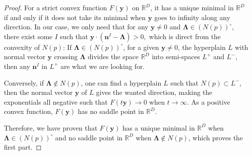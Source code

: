 \documentclass[12pt]{article}
\theoremstyle{definition}
\theoremstyle{plain}
\begin{document}
\begin{proof}
For a strict convex function $F(\mathbf y)$ on $\mathbb R^D$, it has a unique minimal in $\mathbb R^D$ 
if and only if it does not take its minimal when $\mathbf{y}$ goes to infinity along any direction. 
In our case, we only need that for any $\mathbf{y}\neq 0$ and $\mathbf\Lambda \in (N(p))^\circ $, 
there exist some $I$ such that  
\(
	\mathbf{y}\cdot (\mathbf{n}^I-\mathbf{\Lambda})>0,
\)
which is direct from the convexity of $N(p)$: If $\mathbf\Lambda \in (N(p))^\circ$,
for a given $\mathbf y\neq 0$, the hyperplain $L$ with normal vector $\mathbf y$ crossing $\mathbf \Lambda$ 
divides the space $\mathbb R^D$ into semi-spaces $L^+$ and $L^-$, then any $\mathbf{n}^I$ 
in $L^+$ are what we are looking for.

\begin{center}
\end{center}
Conversely, if $\mathbf\Lambda \not\in N(p)$, one can find a hyperplain $L$ such that $N(p)\subset L^-$, 
then the normal vector $\mathbf{y}$ of $L$ gives the wanted direction, making the exponentials all negative
such that $F(t\mathbf y)\to 0$ when $t\to \infty$. 
As a positive convex function, $F(\mathbf y)$ has no saddle point in $\mathbb R^D$.

Therefore, we have proven that $F(\mathbf y)$ has a unique minimal in $\mathbb R^D$ when 
$\mathbf \Lambda \in (N(p))^\circ$ and no saddle point in $\mathbb R^D$ when 
$\mathbf \Lambda \not\in N(p)$, which proves the first part.


\end{proof}
\end{document}
